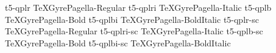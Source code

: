 \documentclass[test]{vnsample}
\begin{document}
\begin{shortsample}
    {t5-qplr}     {TeXGyrePagella-Regular}
   {t5-qplri}    {TeXGyrePagella-Italic}
    {t5-qplb}     {TeXGyrePagella-Bold}
   {t5-qplbi}    {TeXGyrePagella-BoldItalic}
   {t5-qplr-sc}  {TeXGyrePagella-Regular}
 {t5-qplri-sc} {TeXGyrePagella-Italic}
   {t5-qplb-sc}  {TeXGyrePagella-Bold}
 {t5-qplbi-sc} {TeXGyrePagella-BoldItalic}
\end{shortsample}
\end{document}
